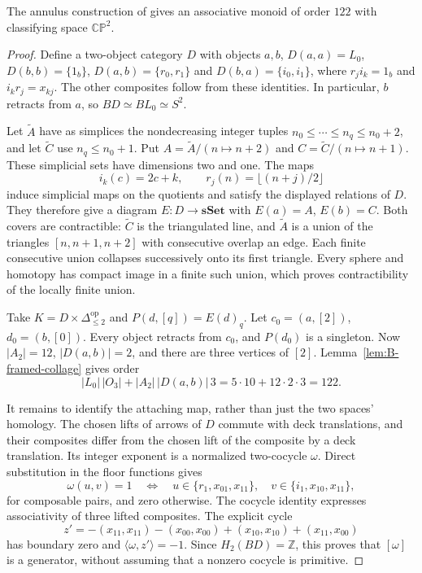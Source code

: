 \begin{proposition}\label{prop:B-CP122}
The annulus construction of \cite{BenBassatSupplementB} gives an associative monoid of order $122$
with classifying space $\mathbb{CP}^2$.
\end{proposition}
\begin{proof}
Define a two-object category $D$ with objects $a,b$,
$D(a,a)=L_0$, $D(b,b)=\{1_b\}$,
$D(a,b)=\{r_0,r_1\}$ and $D(b,a)=\{i_0,i_1\}$,
where $r_j i_k=1_b$ and $i_k r_j=x_{kj}$.
The other composites follow from these identities.  In particular,
$b$ retracts from $a$, so $BD\simeq BL_0\simeq S^2$.

Let $\widetilde A$ have as simplices the nondecreasing integer tuples
$n_0\le\cdots\le n_q\le n_0+2$, and let
$\widetilde C$ use $n_q\le n_0+1$.  Put
$A=\widetilde A/(n\mapsto n+2)$ and
$C=\widetilde C/(n\mapsto n+1)$.  These simplicial sets have
dimensions two and one.  The maps
\[
 i_k(c)=2c+k,\qquad r_j(n)=\lfloor(n+j)/2\rfloor
\]
induce simplicial maps on the quotients and satisfy the displayed
relations of $D$.  They therefore give a diagram $E:D\to\mathbf{sSet}$
with $E(a)=A$, $E(b)=C$.  Both covers are contractible: $\widetilde C$
is the triangulated line, and $\widetilde A$ is a union of the
triangles $[n,n+1,n+2]$ with consecutive overlap an edge.  Each finite
consecutive union collapses successively onto its first triangle.
Every sphere and homotopy has compact image in a finite such union,
which proves contractibility of the locally finite union.

Take $K=D\times\Delta_{\le2}^{\mathrm{op}}$ and
$P(d,[q])=E(d)_q$.  Let $c_0=(a,[2])$, $d_0=(b,[0])$.
Every object retracts from $c_0$, and $P(d_0)$ is a singleton.
Now $|A_2|=12$, $|D(a,b)|=2$, and there are three vertices of
$[2]$.  Lemma~\ref{lem:B-framed-collage} gives order
\[
 |L_0|\,|O_3|+|A_2|\,|D(a,b)|\,3
       =5\cdot10+12\cdot2\cdot3=122.
\]

It remains to identify the attaching map, rather than just the two
spaces' homology.  The chosen lifts of arrows of $D$ commute with
deck translations, and their composites differ from the chosen lift
of the composite by a deck translation.  Its integer exponent is a
normalized two-cocycle $\omega$.  Direct substitution in the floor
functions gives
\[
 \omega(u,v)=1\quad\Longleftrightarrow\quad
 u\in\{r_1,x_{01},x_{11}\},\quad
 v\in\{i_1,x_{10},x_{11}\},
\]
for composable pairs, and zero otherwise.  The cocycle identity
expresses associativity of three lifted composites.  The explicit cycle
\[
 z' =-(x_{11},x_{11})-(x_{00},x_{00})
          +(x_{10},x_{10})+(x_{11},x_{00})
\]
has boundary zero and $\langle\omega,z'\rangle=-1$.
Since $H_2(BD)=\mathbb Z$, this proves that $[\omega]$ is a
generator, without assuming that a nonzero cocycle is primitive.


\end{proof}
